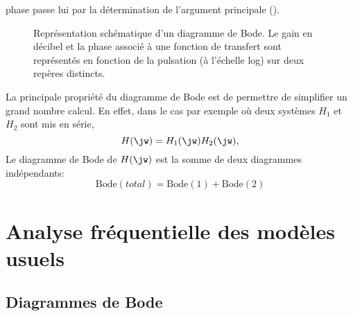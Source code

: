 phase passe lui par la détermination de l'argument principale 
().
\begin{figure}[!h]
    \centering
    
    \caption{Représentation schématique d'un diagramme de Bode. Le gain en 
             décibel et la phase associé à une fonction de transfert sont 
             représentés en fonction de la pulsation (à l'échelle log) sur 
             deux repères distincts.\label{fig-sche_bode}}
\end{figure}

La principale propriété du diagramme de Bode est de permettre de 
simplifier un grand nombre calcul. En effet, dans le cas par exemple où 
deux systèmes $H_1$ et $H_2$ sont mis en série,
\[
H(\jw)=H_1(\jw)H_2(\jw),
\]
Le diagramme de Bode de $H(\jw)$ est la somme de deux diagrammes indépendants:
\[
\mathrm{Bode}(total)=\mathrm{Bode}(1)+\mathrm{Bode}(2)
\]
\clearpage
\restoregeometry
\captionsetup{width=0.9\linewidth}
\section*{Analyse fréquentielle des modèles usuels}
\subsection*{Diagrammes de Bode}

